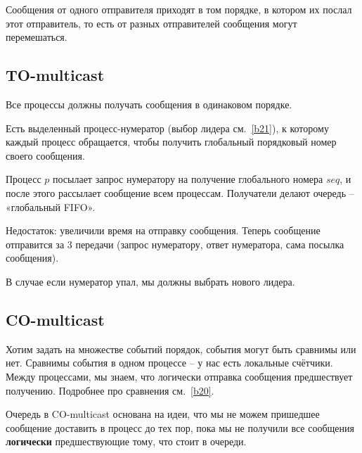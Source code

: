 Сообщения от одного отправителя приходят в том порядке, в котором их послал этот отправитель, то есть от разных отправителей сообщения могут перемешаться.



\subsection*{TO-multicast}\label{b19:part4}

Все процессы должны получать сообщения в одинаковом порядке.

Есть выделенный процесс-нумератор (выбор лидера см.~\ref{b21}), к которому каждый процесс обращается, чтобы получить глобальный порядковый номер своего сообщения.

Процесс $p$ посылает запрос нумератору на получение глобального номера $seq$, и после этого рассылает сообщение всем процессам. Получатели делают очередь -- «глобальный FIFO».

Недостаток: увеличили время на отправку сообщения. Теперь сообщение отправится за 3 передачи (запрос нумератору, ответ нумератора, сама посылка сообщения).

В случае если нумератор упал, мы должны выбрать нового лидера.


\subsection*{CO-multicast}\label{b19:part5}

Хотим задать на множестве событий порядок, события могут быть сравнимы или нет. Сравнимы события в одном процессе -- у нас есть локальные счётчики. Между процессами, мы знаем, что логически отправка сообщения предшествует получению. Подробнее про сравнения см.~\ref{b20}.

Очередь в CO-multicast основана на идеи, что мы не можем пришедшее сообщение доставить в процесс до тех пор, пока мы не получили все сообщения \textbf{логически} предшествующие тому, что стоит в очереди.